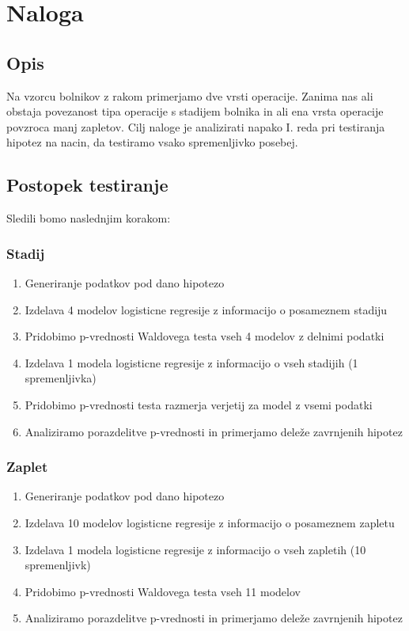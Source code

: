 \documentclass[letterpaper,11pt]{article}
\begin{document}
\section{Naloga}
\subsection{Opis}
Na vzorcu bolnikov z rakom primerjamo dve vrsti operacije. Zanima nas ali obstaja povezanost tipa operacije s stadijem bolnika in ali ena vrsta operacije povzroca manj zapletov. Cilj naloge je analizirati napako I. reda pri testiranja hipotez na nacin, da testiramo vsako spremenljivko posebej. 

\subsection{Postopek testiranje}
Sledili bomo naslednjim korakom:

\subsubsection{Stadij}
\begin{enumerate}
  \item Generiranje podatkov pod dano hipotezo
  \item Izdelava 4 modelov logisticne regresije z informacijo o posameznem stadiju
  \item Pridobimo p-vrednosti Waldovega testa vseh 4 modelov z delnimi podatki
  \item Izdelava 1 modela logisticne regresije z informacijo o vseh stadijih (1 spremenljivka)
  \item Pridobimo p-vrednosti testa razmerja verjetij za model z vsemi podatki
  \item Analiziramo porazdelitve p-vrednosti in primerjamo deleže zavrnjenih hipotez
\end{enumerate}

\subsubsection{Zaplet}
\begin{enumerate}
  \item Generiranje podatkov pod dano hipotezo
  \item Izdelava 10 modelov logisticne regresije z informacijo o posameznem zapletu
  \item Izdelava 1 modela logisticne regresije z informacijo o vseh zapletih (10 spremenljivk)
  \item Pridobimo p-vrednosti Waldovega testa vseh 11 modelov
  \item Analiziramo porazdelitve p-vrednosti in primerjamo deleže zavrnjenih hipotez
\end{enumerate}
\end{document}
